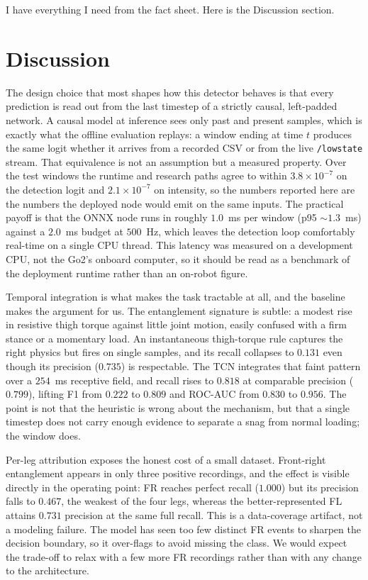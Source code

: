 I have everything I need from the fact sheet. Here is the Discussion section.

\section{Discussion}

The design choice that most shapes how this detector behaves is that every prediction is read out from the last timestep of a strictly causal, left-padded network. A causal model at inference sees only past and present samples, which is exactly what the offline evaluation replays: a window ending at time $t$ produces the same logit whether it arrives from a recorded CSV or from the live \texttt{/lowstate} stream. That equivalence is not an assumption but a measured property. Over the test windows the runtime and research paths agree to within $3.8\times10^{-7}$ on the detection logit and $2.1\times10^{-7}$ on intensity, so the numbers reported here are the numbers the deployed node would emit on the same inputs. The practical payoff is that the ONNX node runs in roughly $1.0$~ms per window (p95 $\sim1.3$~ms) against a $2.0$~ms budget at $500$~Hz, which leaves the detection loop comfortably real-time on a single CPU thread. This latency was measured on a development CPU, not the Go2's onboard computer, so it should be read as a benchmark of the deployment runtime rather than an on-robot figure.

Temporal integration is what makes the task tractable at all, and the baseline makes the argument for us. The entanglement signature is subtle: a modest rise in resistive thigh torque against little joint motion, easily confused with a firm stance or a momentary load. An instantaneous thigh-torque rule captures the right physics but fires on single samples, and its recall collapses to $0.131$ even though its precision ($0.735$) is respectable. The TCN integrates that faint pattern over a $254$~ms receptive field, and recall rises to $0.818$ at comparable precision ($0.799$), lifting F1 from $0.222$ to $0.809$ and ROC-AUC from $0.830$ to $0.956$. The point is not that the heuristic is wrong about the mechanism, but that a single timestep does not carry enough evidence to separate a snag from normal loading; the window does.

Per-leg attribution exposes the honest cost of a small dataset. Front-right entanglement appears in only three positive recordings, and the effect is visible directly in the operating point: FR reaches perfect recall ($1.000$) but its precision falls to $0.467$, the weakest of the four legs, whereas the better-represented FL attains $0.731$ precision at the same full recall. This is a data-coverage artifact, not a modeling failure. The model has seen too few distinct FR events to sharpen the decision boundary, so it over-flags to avoid missing the class. We would expect the trade-off to relax with a few more FR recordings rather than with any change to the architecture.

